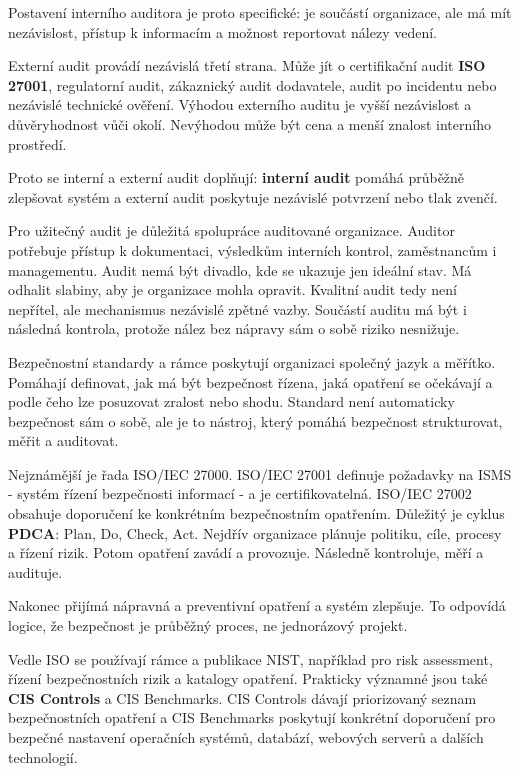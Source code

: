 Postavení interního auditora je proto specifické: je součástí organizace, ale má mít nezávislost, přístup k informacím a možnost reportovat nálezy vedení.

Externí audit provádí nezávislá třetí strana. Může jít o certifikační audit \textbf{ISO 27001}, regulatorní audit, zákaznický audit dodavatele, audit po incidentu nebo nezávislé technické ověření. Výhodou externího auditu je vyšší nezávislost a důvěryhodnost vůči okolí. Nevýhodou může být cena a menší znalost interního prostředí.

Proto se interní a externí audit doplňují: \textbf{interní audit} pomáhá průběžně zlepšovat systém a externí audit poskytuje nezávislé potvrzení nebo tlak zvenčí.

Pro užitečný audit je důležitá spolupráce auditované organizace. Auditor potřebuje přístup k dokumentaci, výsledkům interních kontrol, zaměstnancům i managementu. Audit nemá být divadlo, kde se ukazuje jen ideální stav. Má odhalit slabiny, aby je organizace mohla opravit. Kvalitní audit tedy není nepřítel, ale mechanismus nezávislé zpětné vazby. Součástí auditu má být i následná kontrola, protože nález bez nápravy sám o sobě riziko nesnižuje.

Bezpečnostní standardy a rámce poskytují organizaci společný jazyk a měřítko. Pomáhají definovat, jak má být bezpečnost řízena, jaká opatření se očekávají a podle čeho lze posuzovat zralost nebo shodu. Standard není automaticky bezpečnost sám o sobě, ale je to nástroj, který pomáhá bezpečnost strukturovat, měřit a auditovat.

Nejznámější je řada ISO/IEC 27000. ISO/IEC 27001 definuje požadavky na ISMS - systém řízení bezpečnosti informací - a je certifikovatelná. ISO/IEC 27002 obsahuje doporučení ke konkrétním bezpečnostním opatřením. Důležitý je cyklus \textbf{PDCA}: Plan, Do, Check, Act. Nejdřív organizace plánuje politiku, cíle, procesy a řízení rizik. Potom opatření zavádí a provozuje. Následně kontroluje, měří a audituje.

Nakonec přijímá nápravná a preventivní opatření a systém zlepšuje. To odpovídá logice, že bezpečnost je průběžný proces, ne jednorázový projekt.

Vedle ISO se používají rámce a publikace NIST, například pro risk assessment, řízení bezpečnostních rizik a katalogy opatření. Prakticky významné jsou také \textbf{CIS Controls} a CIS Benchmarks. CIS Controls dávají priorizovaný seznam bezpečnostních opatření a CIS Benchmarks poskytují konkrétní doporučení pro bezpečné nastavení operačních systémů, databází, webových serverů a dalších technologií.

